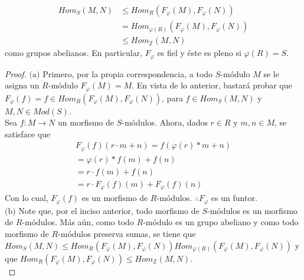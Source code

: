 \documentclass{article}
\newcommand{\lrprth}[1]{
	\left(#1\right)
}
\newcommand{\ringmodhom}[3]{
	Hom_{#1}\lrprth{#2,#3}
}
\theoremstyle{definition}
\theoremstyle{plain}
\theoremstyle{plain}
\theoremstyle{definition}
\theoremstyle{definition}
\theoremstyle{definition}
\theoremstyle{definition}
\theoremstyle{definition}
\theoremstyle{definition}
\begin{document}
\begin{enumerate}[label=\textbf{Ej \arabic*.}]
\begin{enumerate}
	\begin{align*}
		\ringmodhom{S}{M}{N} &\leq \ringmodhom{R}{F_{\varphi}\lrprth{M}}{F_{\varphi}\lrprth{N}}\\
		&= \ringmodhom{\varphi \lrprth{R}}{F_{\varphi}\lrprth{M}}{F_{\varphi}\lrprth{N}}\\
		&\leq \ringmodhom{\mathbb{Z}}{M}{N}
	\end{align*}
	como grupos abelianos. En particular, $F_{\varphi}$ es fiel y éste es pleno si $\varphi \lrprth{R}=S$.
\end{enumerate}
\begin{proof}
	$\boxed{\text{(a)}}$ Primero, por la propia correspondencia, a todo $S$-módulo $M$ se le asigna un $R$-módulo $F_{\varphi} \lrprth{M}=M$. En vista de lo anterior, bastará probar que $F_{\varphi}\lrprth{f} = f \in \ringmodhom{R}{F_{\varphi}\lrprth{M}}{F_{\varphi}\lrprth{N}}$, para $f \in \ringmodhom{S}{M}{N}$ y $M,N \in Mod\lrprth{S}$.\\
	
	Sea $f:M \longrightarrow N$ un morfismo de $S$-módulos. Ahora, dados $r \in R$ y $m,n \in M$, se satisface que
	\begin{align*}
		F_{\varphi}\lrprth{f}\lrprth{r \cdot m + n}=f\lrprth{\varphi\lrprth{r}*m+n}\\
		=\varphi \lrprth{r}*f\lrprth{m}+f\lrprth{n}\\
		=r \cdot f\lrprth{m}+f\lrprth{n}\\
		=r \cdot F_{\varphi} \lrprth{f}\lrprth{m}+F_{\varphi} \lrprth{f}\lrprth{n}
	\end{align*}
	Con lo cual, $F_{\varphi} \lrprth{f}$ es un morfismo de $R$-módulos. $\therefore F_{\varphi}$ es un funtor.\\
	
	$\boxed{\text{(b)}}$ Note que, por el inciso anterior, todo morfismo de $S$-módulos es un morfismo de $R$-módulos. Más aún, como todo $R$-módulo es un grupo abeliano y como todo morfismo de $R$-módulos preserva sumas, se tiene que $\ringmodhom{S}{M}{N}\leq\ringmodhom{R}{F_{\varphi}\lrprth{M}}{F_{\varphi}\lrprth{N}}\ringmodhom{\varphi \lrprth{R}}{F_{\varphi}\lrprth{M}}{F_{\varphi}\lrprth{N}}$ y que $\ringmodhom{R}{F_{\varphi}\lrprth{M}}{F_{\varphi}\lrprth{N}} \leq \ringmodhom{\mathbb{Z}}{M}{N}$.\\
	

\end{proof}
\end{enumerate}
\end{document}
